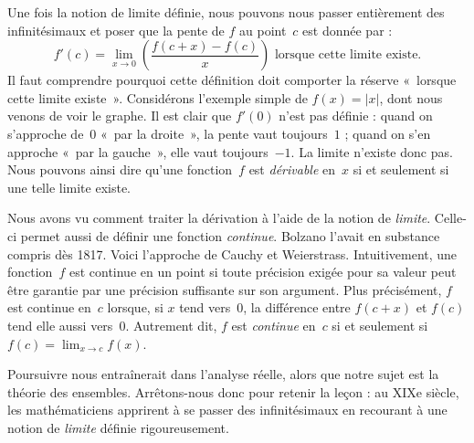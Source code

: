 \documentclass[../../../include/open-logic-section]{subfiles}
\begin{document}
Une fois la notion de limite définie, nous pouvons nous passer
entièrement des infinitésimaux et poser que la pente de $f$ au
point~$c$ est donnée par :
\[
	{f}'(c) = \lim_{x \rightarrow 0}\left(\frac{f(c +x) - f(c)}{x}\right)
	\text{ lorsque cette limite existe.}
\]
Il faut comprendre pourquoi cette définition doit comporter la
réserve «~lorsque cette limite existe~». Considérons l'exemple simple
de $f(x) = |x|$, dont nous venons de voir le graphe. Il est clair que
$f'(0)$ n'est pas définie : quand on s'approche de~$0$ «~par la
droite~», la pente vaut toujours~$1$ ; quand on s'en approche «~par
la gauche~», elle vaut toujours~$-1$. La limite n'existe donc pas.
Nous pouvons ainsi dire qu'une fonction~$f$ est \emph{dérivable}
en~$x$ si et seulement si une telle limite existe.

Nous avons vu comment traiter la dérivation à l'aide de la notion
de \emph{limite}. Celle-ci permet aussi de définir une fonction
\emph{continue}. Bolzano l'avait en substance compris dès 1817.
Voici l'approche de Cauchy et Weierstrass. Intuitivement, une
fonction~$f$ est continue en un point si toute précision exigée
pour sa valeur peut être garantie par une précision suffisante sur
son argument. Plus précisément, $f$ est continue en~$c$ lorsque,
si $x$ tend vers~$0$, la différence entre $f(c + x)$ et $f(c)$
tend elle aussi vers~$0$. Autrement dit, $f$ est \emph{continue}
en~$c$ si et seulement si
$f(c) = \lim_{x \rightarrow c} f(x)$.

Poursuivre nous entraînerait dans l'analyse réelle, alors que notre
sujet est la théorie des ensembles. Arrêtons-nous donc pour retenir
la leçon : au XIXe siècle, les mathématiciens apprirent à se passer
des infinitésimaux en recourant à une notion de \emph{limite}
définie rigoureusement.
\end{document}
